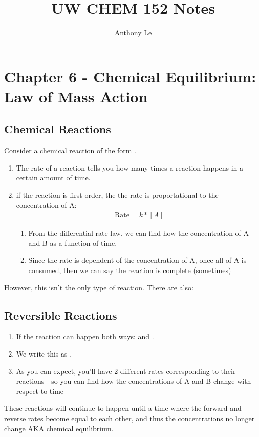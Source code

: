\documentclass{article}  %
\title{UW CHEM 152 Notes}
\author{Anthony Le}
\begin{document}
\pagestyle{fancy}
\fancyhead{}

\section*{Chapter 6 - Chemical Equilibrium: Law of Mass Action}

\subsection*{Chemical Reactions}
Consider a chemical reaction of the form .
\begin{enumerate}
    \item The rate of a reaction tells you how many times a reaction happens in a certain amount of time.
    \item if the reaction  is first order, the the rate is proportational to the concentration of A: 
    \begin{equation*}
        \begin{aligned}
            \text{Rate} = k * [A]    
        \end{aligned}
    \end{equation*}
    \begin{enumerate}
        \item From the differential rate law, we can find how the concentration of A and B as a function of time. 
        \item Since the rate is dependent of the concentration of A, once all of A is consumed, then we can say the reaction is complete (sometimes)
    \end{enumerate} 
\end{enumerate}

However, this isn't the only type of reaction. There are also:

\subsection*{Reversible Reactions}
\begin{enumerate}
    \item If the reaction can happen both ways:  and . 
    \item We write this as . 
    \item As you can expect, you'll have 2 different rates corresponding to their reactions - so you can find how the concentrations of A and B change with respect to time
\end{enumerate}
These reactions will continue to happen until a time where the forward and reverse rates become equal to each other, and thus the concentrations no longer change AKA chemical equilibrium.
\end{document}
